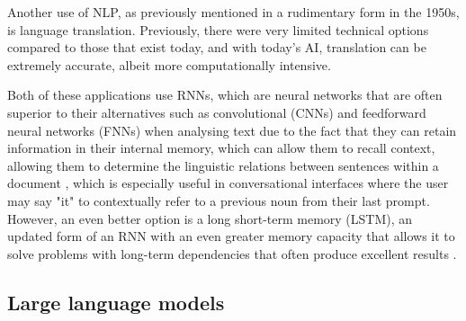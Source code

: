 \documentclass[12pt]{report}
\begin{document}
    Another use of NLP, as previously mentioned in a rudimentary form in the 1950s, is language translation. Previously, there were very limited technical options compared to 
    those that exist today, and with today's AI, translation can be extremely accurate, albeit more computationally intensive.
    
    
    Both of these applications use RNNs, which are neural networks that are often superior to their alternatives such as convolutional (CNNs)
    and feedforward neural networks (FNNs) when analysing text due to the fact that they can retain information in their internal memory, which can allow them 
    to recall context, allowing them to determine the linguistic relations between sentences within a document \autocite{tang_document_2015}, 
    which is especially useful in conversational interfaces where the user may say "it" to contextually refer to a previous noun from their last prompt. However,
    an even better option is a long short-term memory (LSTM), an updated form of an RNN with an even greater memory capacity that allows it to solve problems 
    with long-term dependencies \autocite{hochreiter_long_1997} that often produce excellent results \autocite{sherstinsky_fundamentals_2020}.

    \pagebreak 

    \subsection{Large language models}
\end{document}

